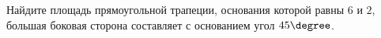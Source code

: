 \begin{ex}
	\begin{condition}
		Найдите площадь прямоугольной трапеции, основания которой равны \( 6  \) и  \( 2 \), большая боковая сторона составляет с основанием угол \( 45\degree \).
	\end{condition}
\end{ex}